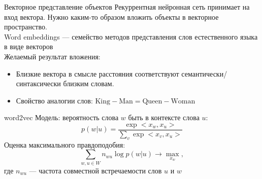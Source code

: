 \documentclass[unicode,9pt, pdf]{beamer}
\begin{document}
\begin{frame}{Векторное представление объектов}
    Рекуррентная нейронная сеть принимает на вход вектора. Нужно каким-то образом вложить объекты в векторное пространство.\\
    \vspace{0.5cm}
    Word embeddings --- семейство методов представления слов естественного языка в виде векторов \\
    \vspace{0.5cm}
		Желаемый результат вложения:
		\begin{itemize}
			\item  Близкие вектора в смысле расстояния соответствуют семантически/синтаксически близким словам.\\
			
			\item Свойство аналогии слов: $ \text{King} - \text{Man} = \text{Queen} - \text{Woman} $
 		\end{itemize}
 		\begin{block}{word2vec}
 		    Модель: вероятность слова $w$ быть в контексте слова $u$:
 		    $$p(w|u) = \dfrac{\exp <x_w, x_u>}{\sum_v \exp<x_v, x_u>}$$
 		    Оценка максимального правдоподобия:
 		    $$\sum_{w,u \in W} n_{wu} \log p(w|u) \rightarrow \max_{x_w},$$ где $n_{wu}$ --- частота совместной встречаемости слов $u$ и $w$
 		\end{block}
\end{frame}
	
\end{document}
